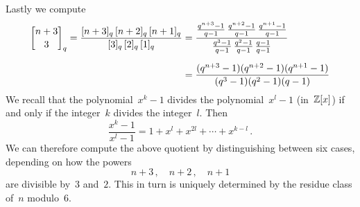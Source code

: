 \documentclass[a4paper,11pt]{scrartcl}
\begin{document}
Lastly we compute
\begin{align*}
  \qbinom{n+3}{3}_q
  =
  \frac{ \qnum{n+3}_q \, \qnum{n+2}_q \, \qnum{n+1}_q }{ \qnum{3}_q \, \qnum{2}_q \, \qnum{1}_q }
  &=
  \frac{
    \frac{q^{n+3} - 1}{q - 1} \, \frac{q^{n+2} - 1}{q - 1} \, \frac{q^{n+1} - 1}{q - 1}
  }{
    \frac{q^3 - 1}{q - 1} \, \frac{q^2 - 1}{q - 1} \, \frac{q - 1}{q - 1}
  }
  \\[0.6em]
  &=
  \frac{ (q^{n+3} - 1) (q^{n+2} - 1) (q^{n+1} - 1) }{ (q^3 - 1) (q^2 - 1) (q - 1) }
\end{align*}
We recall that the polynomial~$x^k - 1$ divides the polynomial~$x^l - 1$ (in~$\mathbb{Z}[x]$) if and only if the integer~$k$ divides the integer~$l$.
Then
\[
  \frac{x^k - 1}{x^l - 1}
  =
  1 + x^l + x^{2l} + \dotsb + x^{k-l} \,.
\]
We can therefore compute the above quotient by distinguishing between six cases, depending on how the powers
\[
  n + 3 \,,
  \quad
  n + 2 \,,
  \quad
  n + 1
\]
are divisible by~$3$ and~$2$.
This in turn is uniquely determined by the residue class of~$n$ modulo~$6$.
\end{document}
